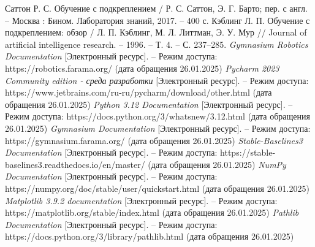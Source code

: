 \begin{thebibliography}{}
	Саттон Р. С. Обучение с подкреплением / Р. С. Саттон, Э. Г. Барто; пер. с англ. – Москва : Бином. Лаборатория знаний, 2017. – 400 с.
	Кэблинг Л. П. Обучение с подкреплением: обзор / Л. П. Кэблинг, М. Л. Литтман, Э. У. Мур // Journal of artificial intelligence research. – 1996. – Т. 4. – С. 237–285.
	\textit{Gymnasium Robotics Documentation} [Электронный ресурс]. --
	Режим доступа: https://robotics.farama.org/ (дата обращения 26.01.2025)
	\textit{Pycharm 2023 Community edition - среда разработки} [Электронный ресурс]. -- 
	Режим доступа: https://www.jetbrains.com/ru-ru/pycharm/download/other.html (дата обращения 26.01.2025)
	\textit{Python 3.12 Documentation} [Электронный ресурс]. -- 
	Режим доступа: https://docs.python.org/3/whatsnew/3.12.html (дата обращения 26.01.2025)
	\textit{Gymnasium Documentation} [Электронный ресурс]. --
	Режим доступа: https://gymnasium.farama.org/ (дата обращения 26.01.2025)
	\textit{Stable-Baselines3 Documentation} [Электронный ресурс]. --
	Режим доступа: https://stable-baselines3.readthedocs.io/en/master/ (дата обращения 26.01.2025)
	\textit{NumPy Documentation} [Электронный ресурс]. -- 
	Режим доступа: https://numpy.org/doc/stable/user/quickstart.html (дата обращения 26.01.2025)
	\textit{Matplotlib 3.9.2 documentation} [Электронный ресурс]. -- 
	Режим доступа: https://matplotlib.org/stable/index.html (дата обращения 26.01.2025)
	\textit{Pathlib Documentation} [Электронный ресурс]. -- 
	Режим доступа: https://docs.python.org/3/library/pathlib.html (дата обращения 26.01.2025)
\end{thebibliography}